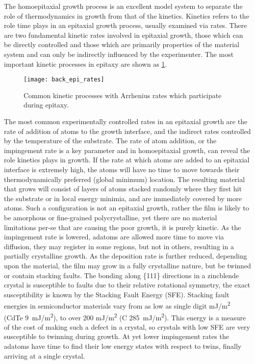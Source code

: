 The homoepitaxial growth process is an excellent model system to separate the role of thermodynamics in growth from that of the kinetics.
Kinetics refers to the role time plays in an epitaxial growth process, usually examined via rates.
There are two fundamental kinetic rates involved in epitaxial growth, those which can be directly controlled and those which are primarily properties of the material system and can only be indirectly influenced by the experimenter. The most important kinetic processes in epitaxy are shown as \cref{fig:back_epi_rates}.
\begin{figure}
 \centering \texttt{[image: back\_epi\_rates]}
 \caption[Kinetic Processes of atoms on surfaces]{\label{fig:back_epi_rates}Common kinetic processes with Arrhenius rates which participate during epitaxy.}
\end{figure}

The most common experimentally controlled rates in an epitaxial growth are the rate of addition of atoms to the growth interface, and the indirect rates controlled by the temperature of the substrate.
The rate of atom addition, or the impingement rate is a key parameter and in homoepitaxial growth, can reveal the role kinetics plays in growth.
If the rate at which atoms are added to an epitaxial interface is extremely high, the atoms will have no time to move towards their thermodynamically preferred (global minimum) location.
The resulting material that grows will consist of layers of atoms stacked randomly where they first hit the substrate or in local energy minimia, and are immediately covered by more atoms.
Such a configuration is not an epitaxial growth, rather the film is likely to be amorphous or fine-grained polycrystalline, yet there are no material limitations per-se that are causing the poor growth, it is purely kinetic.
As the impingement rate is lowered, adatoms are allowed more time to move via diffusion, they may register in some regions, but not in others, resulting in a partially crystalline growth.
As the deposition rate is further reduced, depending upon the material, the film may grow in a fully crystalline nature, but be twinned or contain stacking faults.
The bonding along \{111\} directions in a zincblende crystal is susceptible to faults due to their relative rotational symmetry, the exact susceptibility is known by the Stacking Fault Energy (SFE)\cite{Duffar2010}.
Stacking fault energies in semiconductor materials vary from as low as single digit mJ/m\textsuperscript{2} (CdTe 9~mJ/m\textsuperscript{2}), to over 200 mJ/m\textsuperscript{2} (C 285~mJ/m\textsuperscript{2})\cite{Takeuchi1999}.
This energy is a measure of the cost of making such a defect in a crystal, so crystals with low SFE are very susceptible to twinning during growth.
At yet lower impingement rates the adatoms have time to find their low energy states with respect to twins, finally arriving at a single crystal.

